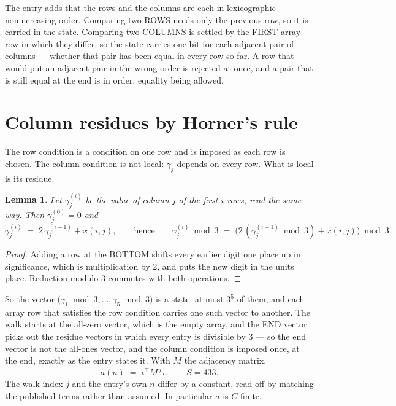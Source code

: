 \documentclass[11pt,a4paper]{article}
\theoremstyle{plain}
\newtheorem{lemma}[theorem]{Lemma}
\theoremstyle{definition}
\begin{document}
The entry adds that the rows and the columns are each in lexicographic nonincreasing order. Comparing
two ROWS needs only the previous row, so it is carried in the state. Comparing two COLUMNS is
settled by the FIRST array row in which they differ, so the state carries one bit for each
adjacent pair of columns --- whether that pair has been equal in every row so far. A row that
would put an adjacent pair in the wrong order is rejected at once, and a pair that is still
equal at the end is in order, equality being allowed.

\section{Column residues by Horner's rule}

The row condition is a condition on one row and is imposed as each row is chosen. The column
condition is not local: $\gamma_j$ depends on every row. What is local is its residue.

\begin{lemma}\label{lem:horner}
Let $\gamma_j^{(i)}$ be the value of column $j$ of the first $i$ rows, read the same way.
Then $\gamma_j^{(0)}=0$ and
\[
\gamma_j^{(i)}\;=\;2\,\gamma_j^{(i-1)}+x(i,j),
\qquad\text{hence}\qquad
\gamma_j^{(i)}\bmod 3\;=\;
\bigl(2\,(\gamma_j^{(i-1)}\bmod 3)+x(i,j)\bigr)\bmod 3 .
\]
\end{lemma}

\begin{proof}
Adding a row at the BOTTOM shifts every earlier digit one place up in significance, which is
multiplication by $2$, and puts the new digit in the units place. Reduction modulo
$3$ commutes with both operations.
\end{proof}

So the vector $\bigl(\gamma_1\bmod 3,\dots,\gamma_{5}\bmod
3\bigr)$ is a state: at most $3^{5}$ of them, and each array row
that satisfies the row condition carries one such vector to another. The walk starts at the
all-zero vector, which is the empty array, and the END vector picks out the residue vectors in
which every entry is divisible by $3$ --- so the end vector is not the all-ones
vector, and the column condition is imposed once, at the end, exactly as the entry states it.
With $M$ the adjacency matrix,
\[
a(n)\;=\;\iota^{\!\top}M^{\,j}\tau ,\qquad S=433.
\]
The walk index $j$ and the entry's own $n$ differ by a constant, read off by matching the
published terms rather than assumed. In particular $a$ is $C$-finite.
\end{document}

